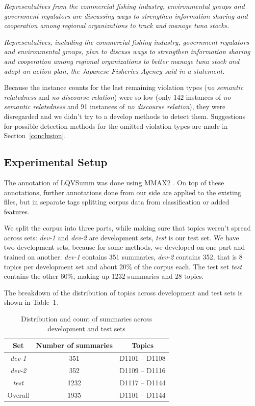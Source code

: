 \documentclass[a4paper,10pt]{scrartcl}
\theoremstyle{style}
\begin{document}
\quad\textit{Representatives from the commercial fishing industry, environmental groups and government regulators are discussing ways to strengthen information sharing and cooperation among regional organizations to track and manage tuna stocks.}

\quad\textit{Representatives, including the commercial fishing industry, government regulators and environmental groups, plan to discuss ways to strengthen information sharing and cooperation among regional organizations to better manage tuna stock and adopt an action plan, the Japanese Fisheries Agency said in a statement.}

Because the instance counts for the last remaining violation types (\textit{no semantic relatedness} and \textit{no discourse relation}) were so low (only 142 instances of \textit{no semantic relatedness} and 91 instances of \textit{no discourse relation}), they were disregarded and we didn't try to a develop methods to detect them.
Suggestions for possible detection methods for the omitted violation types are made in Section~\ref{conclusion}.

\subsection{Experimental Setup}
The annotation of LQVSumm was done using MMAX2 \citep{muller2006multi}. On top of these annotations, further annotations done from our side are applied to the existing files, but in separate tags splitting corpus data from classification or added features.

We split the corpus into three parts, while making sure that topics weren't spread across sets: \textit{dev-1} and \textit{dev-2} are development sets, \textit{test} is our test set. We have two development sets, because for some methods, we developed on one part and trained on another.
\textit{dev-1} contains 351 summaries, \textit{dev-2} contains 352, that is 8 topics per development set and about 20\% of the corpus each.
The test set \textit{test} contains the other 60\%, making up 1232 summaries and 28 topics.

The breakdown of the distribution of topics across development and test sets is shown in Table~1.%

\begin{table}[H]
\begin{center}
\begin{tabular}{|c|c|c|}
\hline
\textbf{Set} & \textbf{Number of summaries} & \textbf{Topics}\\
\hline
\textit{dev-1} & 351 & D1101 -- D1108\\
\hline
\textit{dev-2} & 352 & D1109 -- D1116\\
\hline
\textit{test} & 1232 & D1117 -- D1144\\
\hline\hline
Overall & 1935 & D1101 -- D1144\\
\hline
\end{tabular}
\end{center}
\label{testsets}
\caption{Distribution and count of summaries across development and test sets}
\end{table}
\end{document}

